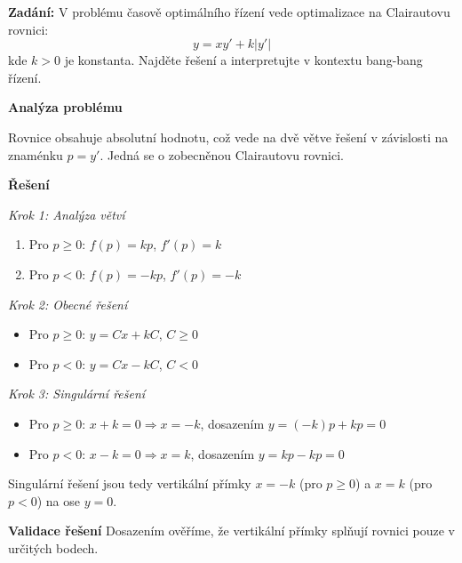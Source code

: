 \begin{example}
\label{ex:bang-bang}

\noindent\textbf{Zadání:} V problému časově optimálního řízení vede optimalizace na Clairautovu rovnici:
\[
y = xy' + k|y'|
\]
kde $k > 0$ je konstanta. Najděte řešení a interpretujte v kontextu bang-bang řízení.

\vspace{1.5\baselineskip}

\noindent\textbf{Analýza problému}

Rovnice obsahuje absolutní hodnotu, což vede na dvě větve řešení v závislosti na znaménku $p = y'$. Jedná se o zobecněnou Clairautovu rovnici.

\vspace{1.5\baselineskip}

\noindent\textbf{Řešení}

\noindent\textit{Krok 1: Analýza větví}
\begin{enumerate}
\item Pro $p \geq 0$: $f(p) = kp$, $f'(p) = k$
\item Pro $p < 0$: $f(p) = -kp$, $f'(p) = -k$
\end{enumerate}

\vspace{1\baselineskip}

\noindent\textit{Krok 2: Obecné řešení}
\begin{itemize}
\item Pro $p \geq 0$: $y = Cx + kC$, $C \geq 0$
\item Pro $p < 0$: $y = Cx - kC$, $C < 0$
\end{itemize}

\vspace{1\baselineskip}

\noindent\textit{Krok 3: Singulární řešení}
\begin{itemize}
\item Pro $p \geq 0$: $x + k = 0 \Rightarrow x = -k$, dosazením $y = (-k)p + kp = 0$
\item Pro $p < 0$: $x - k = 0 \Rightarrow x = k$, dosazením $y = kp - kp = 0$
\end{itemize}
Singulární řešení jsou tedy vertikální přímky $x = -k$ (pro $p \geq 0$) a $x = k$ (pro $p < 0$) na ose $y = 0$.

\vspace{1.5\baselineskip}

\noindent\textbf{Validace řešení}
Dosazením ověříme, že vertikální přímky splňují rovnici pouze v určitých bodech.


\end{example}
